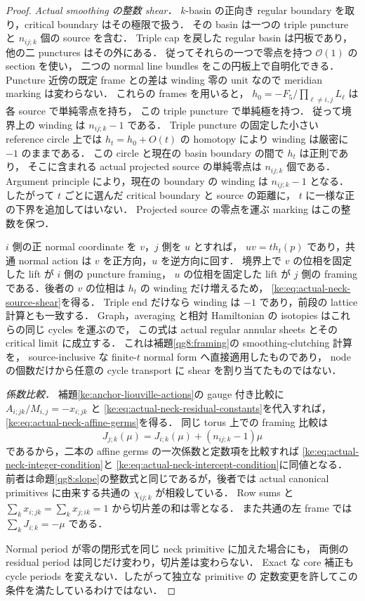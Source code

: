 \begin{proof}
\emph{Actual smoothing の整数 shear．}
$k$-basin の正向き regular boundary を取り，critical boundary はその極限で扱う．
その basin は一つの triple puncture と $n_{ij;k}$ 個の source を含む．
Triple cap を戻した regular basin は円板であり，他の二 punctures はその外にある．
従ってそれらの一つで零点を持つ $\mathcal O(1)$ の section を使い，
二つの normal line bundles をこの円板上で自明化できる．
Puncture 近傍の既定 frame との差は winding 零の unit なので meridian marking は変わらない．
これらの frames を用いると，
$h_0=-F_5/\prod_{\ell\ne i,j}L_\ell$ は各 source で単純零点を持ち，
この triple puncture で単純極を持つ．
従って境界上の winding は $n_{ij;k}-1$ である．
Triple puncture の固定した小さい reference circle 上では
$h_t=h_0+O(t)$ の homotopy により winding は厳密に $-1$ のままである．
この circle と現在の basin boundary の間で $h_t$ は正則であり，
そこに含まれる actual projected source の単純零点は $n_{ij;k}$ 個である．
Argument principle により，現在の boundary の winding は $n_{ij;k}-1$ となる．
したがって $t$ ごとに選んだ critical boundary と source の距離に，
$t$ に一様な正の下界を追加してはいない．
Projected source の零点を運ぶ marking はこの整数を保つ．

$i$ 側の正 normal coordinate を $v$，$j$ 側を $u$ とすれば，
$uv=t h_t(p)$ であり，共通 normal action は $v$ を正方向，$u$ を逆方向に回す．
境界上で $v$ の位相を固定した lift が $i$ 側の puncture framing，
$u$ の位相を固定した lift が $j$ 側の framing である．後者の $v$ の位相は
$h_t$ の winding だけ増えるため，
\eqref{ke:eq:actual-neck-source-shear}を得る．
Triple end だけなら winding は $-1$ であり，前段の lattice 計算とも一致する．
Graph，averaging と相対 Hamiltonian の isotopies はこれらの同じ cycles を運ぶので，
この式は actual regular annular sheets とその critical limit に成立する．
これは補題\ref{qg8:framing}の smoothing-clutching 計算を，
source-inclusive な finite-$t$ normal form へ直接適用したものであり，
node の個数だけから任意の cycle transport に shear を割り当てたものではない．

\emph{係数比較．}
補題\ref{ke:anchor-liouville-actions}の gauge 付き比較に
$A_{i;jk}/M_{i,j}=-x_{i;jk}$ と
\eqref{ke:eq:actual-neck-residual-constants}を代入すれば，
\eqref{ke:eq:actual-neck-affine-germs}を得る．
同じ torus 上での framing 比較は
\[
 J_{j;k}(\mu)=J_{i;k}(\mu)+(n_{ij;k}-1)\mu
\]
であるから，二本の affine germs の一次係数と定数項を比較すれば
\eqref{ke:eq:actual-neck-integer-condition}と
\eqref{ke:eq:actual-neck-intercept-condition}に同値となる．
前者は命題\ref{qg8:slope}の整数式と同じであるが，後者では actual
canonical primitives に由来する共通の $\chi_{ij;k}$ が相殺している．
Row sums と $\sum_kx_{i;jk}=\sum_kx_{j;ik}=1$ から切片差の和は零となる．
また共通の左 frame では $\sum_kJ_{i;k}=-\mu$ である．

Normal period が零の閉形式を同じ neck primitive に加えた場合にも，
両側の residual period は同じだけ変わり，切片差は変わらない．
Exact な core 補正も cycle periods を変えない．したがって独立な primitive の
定数変更を許してこの条件を満たしているわけではない．
\end{proof}

